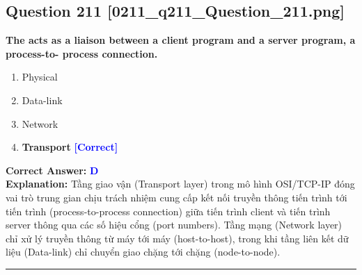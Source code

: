 \documentclass[11pt,a4paper]{article}
\begin{document}
\begin{minipage}{\textwidth}
\subsection*{Question 211 \quad \footnotesize{[0211\_q211\_Question\_211.png]}}
\noindent \textbf{The acts as a liaison between a client program and a server program, a process-to- process connection.}

\begin{enumerate}[label=\Alph*.]
    \item Physical
    \item Data-link
    \item Network
    \item \textbf{Transport} \hfill \textcolor{blue}{\textbf{[Correct]}}
\end{enumerate}

\noindent \textbf{Correct Answer:} \textcolor{blue}{\textbf{D}} \\[2pt]
\noindent \textbf{Explanation:} Tầng giao vận (Transport layer) trong mô hình OSI/TCP-IP đóng vai trò trung gian chịu trách nhiệm cung cấp kết nối truyền thông tiến trình tới tiến trình (process-to-process connection) giữa tiến trình client và tiến trình server thông qua các số hiệu cổng (port numbers). Tầng mạng (Network layer) chỉ xử lý truyền thông từ máy tới máy (host-to-host), trong khi tầng liên kết dữ liệu (Data-link) chỉ chuyển giao chặng tới chặng (node-to-node).

\par\vspace{0.3cm}
\hrule
\vspace{0.3cm}
\end{minipage}
\end{document}
